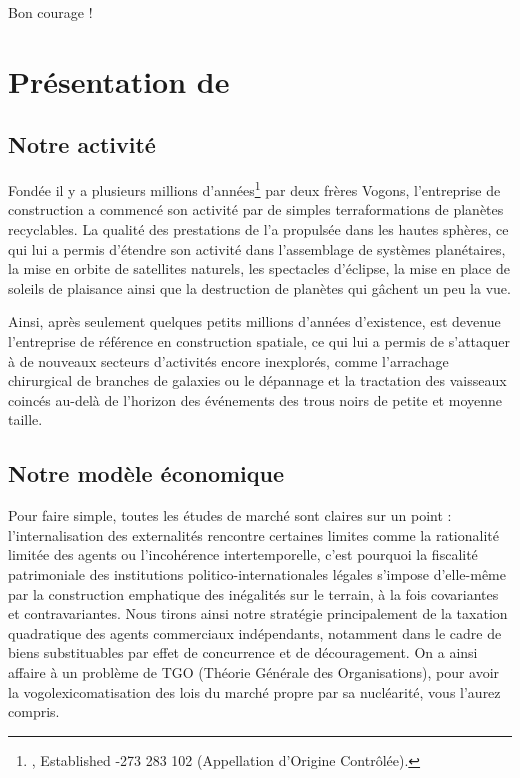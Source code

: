 Bon courage !

\newpage

\section{Présentation de \provogon{}}

\subsection{Notre activité}

Fondée il y a plusieurs millions d'années\footnote{\provogon{}, Established -273 283 102 (Appellation d'Origine Contrôlée).} par deux frères Vogons,
l'entreprise de construction \provogon{} a commencé son activité par de simples
terraformations de planètes recyclables.  La qualité des prestations de
\provogon{} l'a propulsée dans les hautes sphères, ce qui lui a permis
d'étendre son activité dans l'assemblage de systèmes planétaires, la mise en
orbite de satellites naturels, les spectacles d'éclipse, la mise en place de
soleils de plaisance ainsi que la destruction de planètes qui gâchent un peu la
vue.

Ainsi, après seulement quelques petits millions d'années d'existence, \provogon{}
est devenue l'entreprise de référence en construction spatiale, ce qui lui a
permis de s'attaquer à de nouveaux secteurs d'activités encore inexplorés,
comme l'arrachage chirurgical de branches de galaxies ou le dépannage et la
tractation des vaisseaux coincés au-delà de l'horizon des événements des trous
noirs de petite et moyenne taille.

\subsection{Notre modèle économique}

Pour faire simple, toutes les études de marché sont claires sur un point :
l'internalisation des externalités rencontre certaines limites comme la
rationalité limitée des agents ou l'incohérence intertemporelle, c'est pourquoi
la fiscalité patrimoniale des institutions politico-internationales légales
s'impose d'elle-même par la construction emphatique des inégalités sur le
terrain, à la fois covariantes et contravariantes. Nous tirons ainsi notre
stratégie principalement de la taxation quadratique des agents commerciaux
indépendants, notamment dans le cadre de biens substituables par effet de
concurrence et de découragement. On a ainsi affaire à un problème de TGO
(Théorie Générale des Organisations), pour avoir la vogolexicomatisation des
lois du marché propre par sa nucléarité, vous l'aurez compris.

